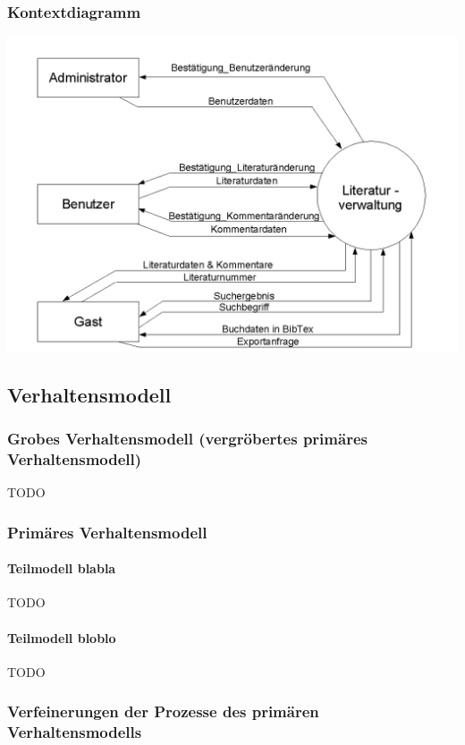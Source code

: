 \subsubsection{Kontextdiagramm}

\centerline{\includegraphics[scale=0.5]{kontextdiagramm.png}}

\subsection{Verhaltensmodell}
\subsubsection{Grobes Verhaltensmodell (vergröbertes primäres Verhaltensmodell)}
TODO

\subsubsection{Primäres Verhaltensmodell}
\paragraph{Teilmodell blabla}
TODO

\paragraph{Teilmodell bloblo}
TODO

\subsubsection{Verfeinerungen der Prozesse des primären Verhaltensmodells}

